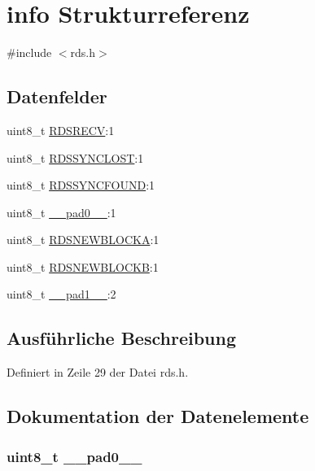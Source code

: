 \hypertarget{structinfo}{}\section{info Strukturreferenz}
\label{structinfo}


{\ttfamily \#include $<$rds.\+h$>$}

\subsection*{Datenfelder}
\begin{DoxyCompactItemize}
\item 
uint8\+\_\+t \hyperlink{structinfo_a56e25cd5c95053ebd95c3c35654680d6}{R\+D\+S\+R\+E\+C\+V}\+:1
\item 
uint8\+\_\+t \hyperlink{structinfo_a73c3d34273c45dd08fcb341496c08052}{R\+D\+S\+S\+Y\+N\+C\+L\+O\+S\+T}\+:1
\item 
uint8\+\_\+t \hyperlink{structinfo_a924e0044d60c0d490d165ceb3ef6b23d}{R\+D\+S\+S\+Y\+N\+C\+F\+O\+U\+N\+D}\+:1
\item 
uint8\+\_\+t \hyperlink{structinfo_a8b4eebe79ded0459acec2f4950102ba3}{\+\_\+\+\_\+pad0\+\_\+\+\_\+}\+:1
\item 
uint8\+\_\+t \hyperlink{structinfo_a62260ece65dc68c2467e5e1b09e5f144}{R\+D\+S\+N\+E\+W\+B\+L\+O\+C\+K\+A}\+:1
\item 
uint8\+\_\+t \hyperlink{structinfo_acd71c83a87b1a99a4784dad5f2a9477f}{R\+D\+S\+N\+E\+W\+B\+L\+O\+C\+K\+B}\+:1
\item 
uint8\+\_\+t \hyperlink{structinfo_a77f12d2e278bd5c07712648ac0df5e08}{\+\_\+\+\_\+pad1\+\_\+\+\_\+}\+:2
\end{DoxyCompactItemize}


\subsection{Ausführliche Beschreibung}


Definiert in Zeile 29 der Datei rds.\+h.



\subsection{Dokumentation der Datenelemente}
\hypertarget{structinfo_a8b4eebe79ded0459acec2f4950102ba3}{}
\subsubsection[{\+\_\+\+\_\+pad0\+\_\+\+\_\+}]{\setlength{\rightskip}{0pt plus 5cm}uint8\+\_\+t \+\_\+\+\_\+pad0\+\_\+\+\_\+}\label{structinfo_a8b4eebe79ded0459acec2f4950102ba3}


